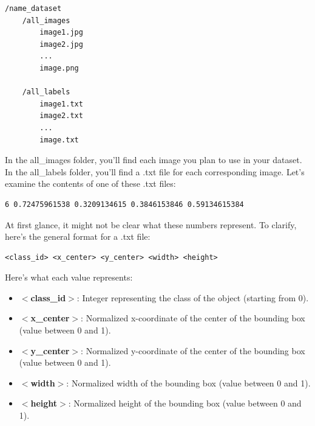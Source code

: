 \documentclass[../main]{subfiles}
\begin{document}
\begin{lstlisting}
/name_dataset
    /all_images
        image1.jpg
        image2.jpg
        ...
        image.png
           
    /all_labels
        image1.txt
        image2.txt
        ...
        image.txt
\end{lstlisting}
In the all\_images folder, you'll find each image you plan to use in your dataset. In the all\_labels folder, you'll find a .txt file for each corresponding image. Let's examine the contents of one of these .txt files:
\begin{lstlisting}
6 0.72475961538 0.3209134615 0.3846153846 0.59134615384
\end{lstlisting}
At first glance, it might not be clear what these numbers represent. To clarify, here's the general format for a .txt file:
\begin{lstlisting}
<class_id> <x_center> <y_center> <width> <height>
\end{lstlisting}
Here's what each value represents:
\begin{itemize}
    \item[\textbullet] \textbf{$<$class\_id$>$}: Integer representing the class of the object (starting from 0).
    \item[\textbullet] \textbf{$<$x\_center$>$}: Normalized x-coordinate of the center of the bounding box (value between 0 and 1).
    \item[\textbullet] \textbf{$<$y\_center$>$}: Normalized y-coordinate of the center of the bounding box (value between 0 and 1).
    \item[\textbullet] \textbf{$<$width$>$}: Normalized width of the bounding box (value between 0 and 1).
    \item[\textbullet] \textbf{$<$height$>$}: Normalized height of the bounding box (value between 0 and 1).
\end{itemize}
\end{document}
